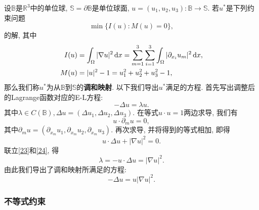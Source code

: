 \begin{example}[到球面的调和映射]
    设$\mathbb{B}$是$\mathbb{R}^3$中的单位球, $\mathbb{S} = \partial\mathbb{B}$是单位球面, $u =(u_1, u_2, u_3)\colon \mathbb{B} \rightarrow \mathbb{S}$.
    若$u^*$是下列约束问题
    \begin{equation*}
        \min\{I(u)\colon M(u) = 0\},
    \end{equation*}
    的解, 其中  
    \begin{align*}
        I(u) &= \int_{\Omega}|\nabla u|^2 \,{\rm d}x = \sum_{m = 1}^3\sum_{i = 1}^3\int_{\Omega}|\partial_{x_i}u_m|^2 \,{\rm d}x, \\  
        M(u) &= |u|^2 - 1 = u_1^2 + u_2^2 + u_3^2 - 1,
    \end{align*}
    那么我们称$u^*$为从$\mathbb{B}$到$\mathbb{S}$的\textbf{调和映射}. 以下我们导出$u^*$满足的方程.
    首先写出调整后的Lagrange函数对应的E-L方程:
    \begin{equation}\label{23}
        -\Delta u = \lambda u.
    \end{equation} 
    其中$\lambda \in C(\mathbb{B}), \Delta u = (\Delta u_1, \Delta u_2, \Delta u_3)$.
    在等式$u \cdot u = 1$两边求导, 我们有
    \begin{equation*}
        u \cdot \partial_m u = 0,
    \end{equation*}
    其中$\partial_mu = (\partial_{x_m}u_1, \partial_{x_m}u_2, \partial_{x_m}u_3)$.
    再次求导, 并将得到的等式相加, 即得
    \begin{equation}\label{24}
        u \cdot \Delta u +|\nabla u|^2 =0.
    \end{equation}
    联立\eqref{23}和\eqref{24}, 得 
    \begin{equation*}
        \lambda = -u \cdot \Delta u = |\nabla u|^2.
    \end{equation*}
    由此我们导出了调和映射所满足的方程:
    \begin{equation*}
        -\Delta u = u|\nabla u|^2.
    \end{equation*}
\end{example}

\subsubsection{不等式约束}

